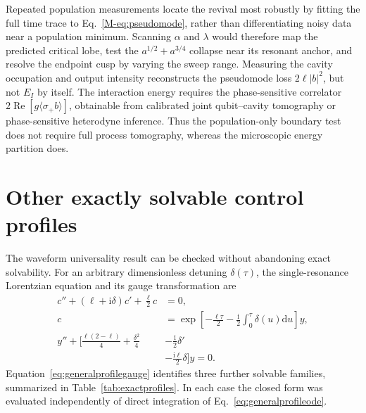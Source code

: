 \documentclass[reprint,superscriptaddress,floatfix,amsmath,amssymb,prresearch,aps]{revtex4-2}
\newcommand{\dd}{\mathrm{d}}
\newcommand{\ii}{\mathrm{i}}
\newcommand{\Ree}{\operatorname{Re}}
\begin{document}
Repeated population measurements locate the revival most robustly by fitting
the full time trace to Eq.~\eqref{M-eq:pseudomode}, rather than differentiating
noisy data near a population minimum. Scanning \(\alpha\) and
\(\lambda\) would therefore map the predicted critical lobe, test
the \(a^{1/2}+a^{3/4}\) collapse near its resonant anchor, and resolve the
endpoint cusp by varying the sweep range. Measuring the cavity occupation
and output intensity reconstructs the pseudomode loss
\(2\ell|b|^2\), but not \(E_I\) by itself. The interaction energy requires
the phase-sensitive correlator
\(2\Ree[g\langle\sigma_+b\rangle]\), obtainable from calibrated joint
qubit--cavity tomography or phase-sensitive heterodyne inference. Thus the
population-only boundary test does not require full process tomography,
whereas the microscopic energy partition does.


\section{Other exactly solvable control profiles}
\label{app:exactprofiles}

The waveform universality result can be checked without abandoning exact
solvability. For an arbitrary dimensionless detuning \(\delta(\tau)\), the
single-resonance Lorentzian equation and its gauge transformation are
\begin{align}
c''+(\ell+\ii\delta)c'+\frac{\ell}{2}c&=0,
\label{eq:generalprofileode}\\
c&=\exp\!\left[-\frac{\ell\tau}{2}
-\frac{\ii}{2}\int_0^\tau\delta(u)\dd u\right]y,
\nonumber\\
y''+\bigg[\frac{\ell(2-\ell)}4+\frac{\delta^2}4
&-\frac{\ii}{2}\delta'
\nonumber\\[-2pt]
&-\frac{\ii\ell}{2}\delta\bigg]y=0.
\label{eq:generalprofilegauge}
\end{align}
Equation~\eqref{eq:generalprofilegauge} identifies three further solvable
families, summarized in Table~\ref{tab:exactprofiles}. In each case the
closed form was evaluated independently of direct integration of
Eq.~\eqref{eq:generalprofileode}.
\end{document}

